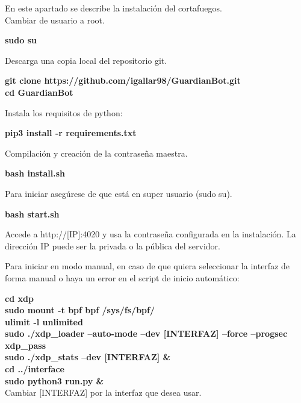 En este apartado se describe la instalación del cortafuegos.
\\Cambiar de usuario a root.
\begin{center}
    \textbf{sudo su}
\end{center}
Descarga una copia local del repositorio git.
\begin{center}
    \textbf{git clone https://github.com/igallar98/GuardianBot.git
\\cd GuardianBot}
\end{center}
Instala los requisitos de python: 
\begin{center}
    \textbf{pip3 install -r requirements.txt}
\end{center}
Compilación y creación de la contraseña maestra.

\begin{center}
    \textbf{bash install.sh}
\end{center}
Para iniciar asegúrese de que está en super usuario (sudo su).
\begin{center}
    \textbf{bash start.sh}
\end{center}
Accede a http://[IP]:4020 y usa la contraseña configurada en la instalación. La dirección IP puede ser la privada o la pública del servidor.

Para iniciar en modo manual, en caso de que quiera seleccionar la interfaz de forma manual o haya un error en el script de inicio automático:

\textbf{
cd xdp
\\sudo mount -t bpf bpf /sys/fs/bpf/
\\ulimit -l unlimited
\\sudo ./xdp\_loader --auto-mode --dev [INTERFAZ] --force --progsec xdp\_pass
\\sudo ./xdp\_stats --dev [INTERFAZ] \&
\\cd ../interface
\\sudo python3 run.py \&
}
\\Cambiar [INTERFAZ] por la interfaz que desea usar.

